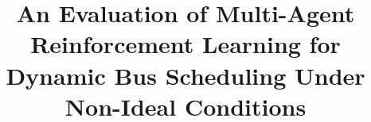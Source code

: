 \documentclass[a4paper, twoside]{report}
\title{An Evaluation of Multi-Agent Reinforcement Learning for Dynamic Bus Scheduling Under Non-Ideal Conditions}
\begin{document}

\end{document}
